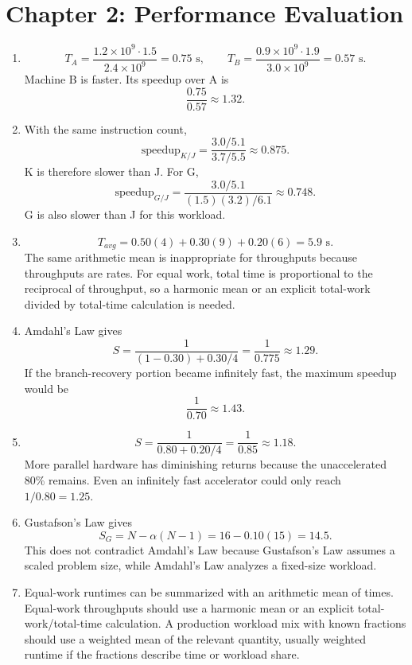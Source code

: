 \documentclass[11pt]{article}
\begin{document}
\section{Chapter 2: Performance Evaluation}
\begin{enumerate}
    \item
    \[
        T_A=\frac{1.2\times10^9\cdot1.5}{2.4\times10^9}=0.75\text{ s},\qquad
        T_B=\frac{0.9\times10^9\cdot1.9}{3.0\times10^9}=0.57\text{ s}.
    \]
    Machine B is faster.
    Its speedup over A is
    \[
        \frac{0.75}{0.57}\approx 1.32.
    \]

    \item With the same instruction count,
    \[
        \text{speedup}_{K/J}=\frac{3.0/5.1}{3.7/5.5}\approx0.875.
    \]
    K is therefore slower than J.
    For G,
    \[
        \text{speedup}_{G/J}
        =\frac{3.0/5.1}{(1.5)(3.2)/6.1}
        \approx0.748.
    \]
    G is also slower than J for this workload.

    \item
    \[
        T_{avg}=0.50(4)+0.30(9)+0.20(6)=5.9\text{ s}.
    \]
    The same arithmetic mean is inappropriate for throughputs because throughputs are rates.
    For equal work, total time is proportional to the reciprocal of throughput, so a harmonic mean or an explicit total-work divided by total-time calculation is needed.

    \item Amdahl's Law gives
    \[
        S=\frac{1}{(1-0.30)+0.30/4}
        =\frac{1}{0.775}\approx1.29.
    \]
    If the branch-recovery portion became infinitely fast, the maximum speedup would be
    \[
        \frac{1}{0.70}\approx1.43.
    \]

    \item
    \[
        S=\frac{1}{0.80+0.20/4}
        =\frac{1}{0.85}\approx1.18.
    \]
    More parallel hardware has diminishing returns because the unaccelerated 80\% remains. Even an infinitely fast accelerator could only reach \(1/0.80=1.25\).

    \item Gustafson's Law gives
    \[
        S_G=N-\alpha(N-1)=16-0.10(15)=14.5.
    \]
    This does not contradict Amdahl's Law because Gustafson's Law assumes a scaled problem size, while Amdahl's Law analyzes a fixed-size workload.

    \item Equal-work runtimes can be summarized with an arithmetic mean of times.
    Equal-work throughputs should use a harmonic mean or an explicit total-work/total-time calculation.
    A production workload mix with known fractions should use a weighted mean of the relevant quantity, usually weighted runtime if the fractions describe time or workload share.


\end{enumerate}
\end{document}
